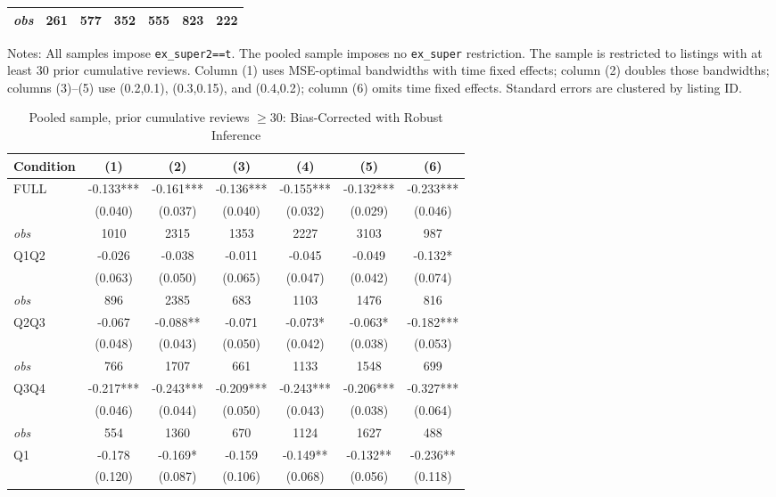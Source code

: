 \begin{table}[!htbp]
\begin{tabular}{lcccccc}
\textit{obs} & 261 & 577 & 352 & 555 & 823 & 222 \\
\bottomrule
\end{tabular}
\begin{minipage}{0.98\textwidth}\footnotesize
Notes: All samples impose \texttt{ex\_super2==t}. The pooled sample imposes no \texttt{ex\_super} restriction. The sample is restricted to listings with at least 30 prior cumulative reviews. Column (1) uses MSE-optimal bandwidths with time fixed effects; column (2) doubles those bandwidths; columns (3)--(5) use (0.2,0.1), (0.3,0.15), and (0.4,0.2); column (6) omits time fixed effects. Standard errors are clustered by listing ID.
\end{minipage}
\end{table}

\begin{table}[!htbp]
\centering
\caption{Pooled sample, prior cumulative reviews $\geq30$: Bias-Corrected with Robust Inference}
\begin{tabular}{lcccccc}
\toprule
Condition & (1) & (2) & (3) & (4) & (5) & (6) \\
\midrule
FULL & -0.133*** & -0.161*** & -0.136*** & -0.155*** & -0.132*** & -0.233*** \\
 & (0.040) & (0.037) & (0.040) & (0.032) & (0.029) & (0.046) \\
\textit{obs} & 1010 & 2315 & 1353 & 2227 & 3103 & 987 \\
Q1Q2 & -0.026 & -0.038 & -0.011 & -0.045 & -0.049 & -0.132* \\
 & (0.063) & (0.050) & (0.065) & (0.047) & (0.042) & (0.074) \\
\textit{obs} & 896 & 2385 & 683 & 1103 & 1476 & 816 \\
Q2Q3 & -0.067 & -0.088** & -0.071 & -0.073* & -0.063* & -0.182*** \\
 & (0.048) & (0.043) & (0.050) & (0.042) & (0.038) & (0.053) \\
\textit{obs} & 766 & 1707 & 661 & 1133 & 1548 & 699 \\
Q3Q4 & -0.217*** & -0.243*** & -0.209*** & -0.243*** & -0.206*** & -0.327*** \\
 & (0.046) & (0.044) & (0.050) & (0.043) & (0.038) & (0.064) \\
\textit{obs} & 554 & 1360 & 670 & 1124 & 1627 & 488 \\
Q1 & -0.178 & -0.169* & -0.159 & -0.149** & -0.132** & -0.236** \\
 & (0.120) & (0.087) & (0.106) & (0.068) & (0.056) & (0.118) \\

\end{tabular}
\end{table}
